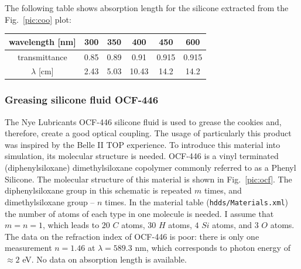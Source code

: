 

The following table shows absorption length for the silicone extracted from the Fig.~\ref{pic:coo} plot:


\begin{center}
\begin{tabular}{| c | c | c | c | c | c|}
\hline
wavelength [nm] & 300 & 350 & 400 & 450 & 600 \\
\hline
transmittance & 0.85 & 0.89 & 0.91 & 0.915 & 0.915 \\
\hline
$\lambda$ [cm] & 2.43 & 5.03 & 10.43 & 14.2 & 14.2 \\
\hline
\end{tabular}
\end{center}

\subsubsection*{Greasing silicone fluid OCF-446}

The Nye Lubricants OCF-446 silicone fluid is used to grease the cookies and, therefore, create a good optical coupling. The usage of particularly this product was inspired by the Belle II TOP experience. To introduce this material into simulation, its molecular structure is needed. OCF-446 is a vinyl terminated (diphenylsiloxane) dimethylsiloxane copolymer commonly referred to as a Phenyl Silicone. The molecular structure of this material is shown in Fig.~\ref{pic:ocf}. The diphenylsiloxane group in this schematic is repeated $m$ times, and dimethylsiloxane group -- $n$ times. In the material table (\texttt{hdds/Materials.xml}) the number of atoms of each type in one molecule is needed. I assume that $m = n = 1$, which leads to $20$ $C$ atoms, $30$ $H$ atoms, $4$ $Si$ atoms, and $3$ $O$ atoms. The data on the refraction index of OCF-446 is poor: there is only one measurement $n = 1.46$ at $\lambda = 589.3$ nm, which corresponds to photon energy of $\approx 2$  eV. No data on absorption length is available.

